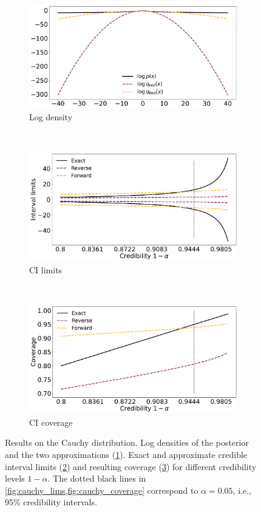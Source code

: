 \begin{figure}[ht]
    \begin{subfigure}{\linewidth}
    \centering
    \includegraphics[width=0.8\linewidth]{fig/cauchy_logq.pdf}
    \caption{Log density}
    \label{fig:cauchy_lp}
    \end{subfigure}\\[1ex]
    \begin{subfigure}{\linewidth}
    \centering
    \includegraphics[width=0.8\linewidth]{fig/cauchy_cilims.pdf}
    \caption{CI limits}
    \label{fig:cauchy_lims}
    \end{subfigure}\\[1ex]
    \begin{subfigure}{\linewidth}
    \centering
    \includegraphics[width=0.8\linewidth]{fig/cauchy_cicoverage.pdf}
    \caption{CI coverage}
    \label{fig:cauchy_coverage}
    \end{subfigure}
    \caption{Results on the Cauchy distribution.
    Log densities of the posterior and
    the two approximations (\cref{fig:cauchy_lp}).
    Exact and approximate credible interval limits (\cref{fig:cauchy_lims})
    and resulting coverage (\cref{fig:cauchy_coverage})
    for different credibility levels $1-\alpha$.
    The dotted black lines in \cref{fig:cauchy_lims,fig:cauchy_coverage}
    correspond to $\alpha=0.05$, i.e., 95\% credibility intervals.}
    \label{fig:cauchy}
\end{figure}
\FloatBarrier


